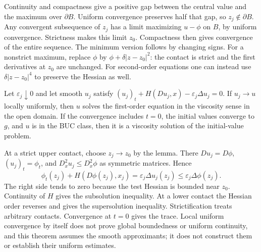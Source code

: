 \begin{expandedproof}
Continuity and compactness give a positive gap between the central value
and the maximum over $\partial B$. Uniform convergence preserves half
that gap, so $z_j\notin\partial B$. Any convergent subsequence of $z_j$
has a limit maximizing $u-\phi$ on $B$, by uniform convergence.
Strictness makes this limit $z_0$. Compactness then gives convergence of
the entire sequence. The minimum version follows by changing signs.
For a nonstrict maximum, replace $\phi$ by
$\phi+\delta|z-z_0|^2$: the contact is strict and the first derivatives at
$z_0$ are unchanged. For second-order equations one can instead use
$\delta|z-z_0|^4$ to preserve the Hessian as well.
\end{expandedproof}
\Needspace{55mm}
\begin{theorem}
Let $\varepsilon_j\downarrow0$ and let smooth $u_j$ satisfy
$(u_j)_t+H(Du_j,x)-\varepsilon_j\Delta u_j=0$.
If $u_j\to u$ locally uniformly, then $u$ solves the first-order equation
in the viscosity sense in the open domain. If the convergence includes
$t=0$, the initial values converge to $g$, and $u$ is in the BUC class,
then it is a viscosity solution of the initial-value problem.
\end{theorem}
\begin{expandedproof}
At a strict upper contact, choose $z_j\to z_0$ by the lemma. There
$D u_j=D\phi$, $(u_j)_t=\phi_t$, and
$D_x^2u_j\leq D_x^2\phi$ as symmetric matrices. Hence
\[
 \phi_t(z_j)+H(D\phi(z_j),x_j)
 =\varepsilon_j\Delta u_j(z_j)
 \leq\varepsilon_j\Delta\phi(z_j).
\]
The right side tends to zero because the test Hessian is bounded near
$z_0$. Continuity of $H$ gives the subsolution inequality. At a lower
contact the Hessian order reverses and gives the supersolution inequality.
Strictification treats arbitrary contacts. Convergence at $t=0$ gives the
trace. Local uniform convergence by itself does not prove global boundedness
or uniform continuity, and this theorem assumes the smooth approximants;
it does not construct them or establish their uniform estimates.
\end{expandedproof}
\Needspace{42mm}

\Needspace{70mm}
